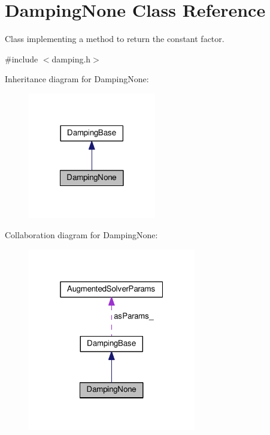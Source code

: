 \hypertarget{classDampingNone}{\section{Damping\-None Class Reference}
\label{classDampingNone}
}


Class implementing a method to return the constant factor.  




{\ttfamily \#include $<$damping.\-h$>$}



Inheritance diagram for Damping\-None\-:
\nopagebreak
\begin{figure}[H]
\begin{center}
\leavevmode
\includegraphics[width=158pt]{classDampingNone__inherit__graph}
\end{center}
\end{figure}


Collaboration diagram for Damping\-None\-:
\nopagebreak
\begin{figure}[H]
\begin{center}
\leavevmode
\includegraphics[width=208pt]{classDampingNone__coll__graph}
\end{center}
\end{figure}
